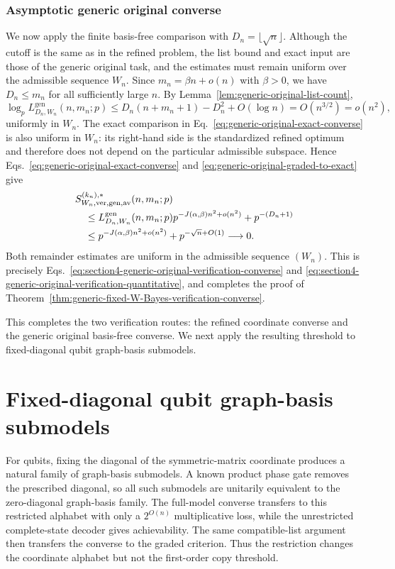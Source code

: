 \documentclass[11pt]{article}
\newcommand{\1}{\mathbf 1}
\theoremstyle{plain}
\theoremstyle{definition}
\theoremstyle{remark}
\begin{document}
\subsubsection{Asymptotic generic original converse}
\label{subsubsec:generic-original-asymptotic-converse}
\label{subsubsec:proof-generic-fixed-W-Bayes-verification-converse}
We now apply the finite basis-free comparison with  
$D_n=\lfloor\sqrt n\rfloor$.  Although the cutoff is the same as in the refined  
problem, the list bound and exact input are those of the generic original task,  
and the estimates must remain uniform over the admissible sequence $W_n$.  
Since $m_n=\beta n+o(n)$ with $\beta>0$, we  
have $D_n\le m_n$ for all sufficiently large $n$.  By
Lemma~\ref{lem:generic-original-list-count},
\begin{equation}
 \log_p L_{D_n,W_n}^{\mathrm{gen}}(n,m_n;p)
 \le D_n(n+m_n+1)-D_n^2+O(\log n)
 =O(n^{3/2})=o(n^2),
 \label{eq:generic-original-list-subquadratic}
\end{equation}
uniformly in $W_n$.  The exact comparison in
Eq.~\eqref{eq:generic-original-exact-converse} is also uniform in $W_n$:
its right-hand side is the standardized refined optimum and therefore does
not depend on the particular admissible subspace.  Hence
Eqs.~\eqref{eq:generic-original-exact-converse} and
\eqref{eq:generic-original-graded-to-exact} give
\begin{align}
 &S_{W_n,\rm ver,gen,av}^{(k_n),*}(n,m_n;p)\notag\\
 &\quad\le L_{D_n,W_n}^{\mathrm{gen}}(n,m_n;p)
       p^{-J(\alpha,\beta)n^2+o(n^2)}
       +p^{-(D_n+1)}\notag\\
 &\quad\le p^{-J(\alpha,\beta)n^2+o(n^2)}
       +p^{-\sqrt n+O(1)}\longrightarrow0.
 \label{eq:generic-original-stretched-exponential}
\end{align}
Both remainder estimates are uniform in the admissible sequence $(W_n)$.  This is precisely
Eqs.~\eqref{eq:section4-generic-original-verification-converse} and
\eqref{eq:section4-generic-original-verification-quantitative}, and completes
the proof of
Theorem~\ref{thm:generic-fixed-W-Bayes-verification-converse}.

This completes the two verification routes: the refined coordinate converse  
and the generic original basis-free converse.  We next apply the resulting  
threshold to fixed-diagonal qubit graph-basis submodels.  
\section{Fixed-diagonal qubit graph-basis submodels}
\label{sec:fixed-diagonal-graph-basis-submodels}
For qubits, fixing the diagonal of the symmetric-matrix coordinate produces a
natural family of graph-basis submodels.  A known product phase gate removes
the prescribed diagonal, so all such submodels are unitarily equivalent to
the zero-diagonal graph-basis family.  The full-model converse transfers to
this restricted alphabet with only a $2^{O(n)}$ multiplicative loss, while the unrestricted
complete-state decoder gives achievability.  The same compatible-list argument
then transfers the converse to the graded criterion.  Thus the restriction
changes the coordinate alphabet but not the first-order copy threshold.
\end{document}
